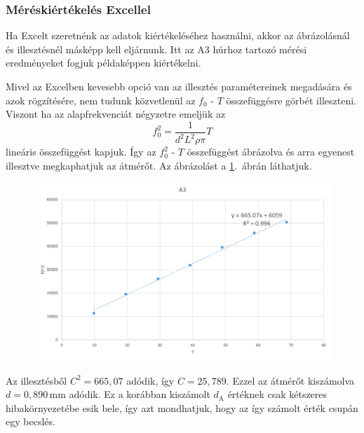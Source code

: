 \documentclass[a4paper,12pt]{article}
\begin{document}
\subsubsection*{Méréskiértékelés Excellel}

Ha Excelt szeretnénk az adatok kiértékeléséhez használni, akkor az ábrázolásnál és illesztésnél másképp kell eljárnunk. Itt az A3 húrhoz tartozó mérési eredményeket fogjuk példaképpen kiértékelni.

Mivel az Excelben kevesebb opció van az illesztés paramétereinek megadására és azok rögzítésére, nem tudunk közvetlenül az $f_0$ - $T$ összefüggésre görbét illeszteni. Viszont ha az alapfrekvenciát négyzetre emeljük az
$$ f_0^2 = \frac{1}{d^2 L^2 \rho \pi} T $$
lineáris összefüggést kapjuk. Így az $f_0^2$ - $T$ összefüggést ábrázolva és arra egyenest illesztve megkaphatjuk az átmérőt. Az ábrázolást a \ref{excel_f2_vs_T}.\ ábrán láthatjuk.

\begin{figure}[h!]
\centering
\includegraphics[width = 14cm]{excel_f2_vs_T.png}
\caption{}
\label{excel_f2_vs_T}
\end{figure}

Az illesztésből $C^2 = 665,07$ adódik, így $C = 25,789$. Ezzel az átmérőt kiszámolva $d = 0,890$\,mm adódik. Ez a korábban kiszámolt $d_\text{A}$ értéknek csak kétszeres hibakörnyezetébe esik bele, így azt mondhatjuk, hogy az így számolt érték csupán egy becslés.
\end{document}
